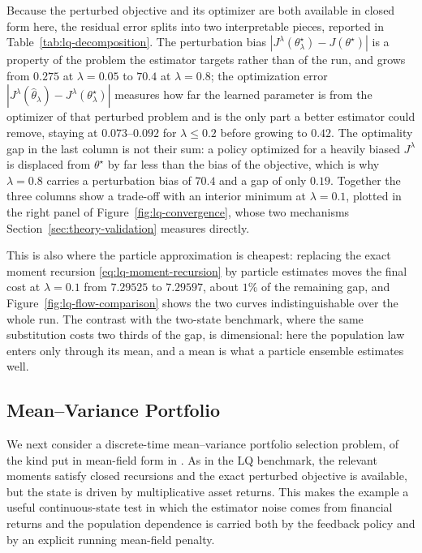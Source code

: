 Because the perturbed objective and its optimizer are both available in closed form here, the residual error splits into two interpretable pieces, reported in Table~\ref{tab:lq-decomposition}. The perturbation bias $|J^\lambda(\theta_\lambda^\star)-J(\theta^\star)|$ is a property of the problem the estimator targets rather than of the run, and grows from $0.275$ at $\lambda=0.05$ to $70.4$ at $\lambda=0.8$; the optimization error $|J^\lambda(\widehat\theta_\lambda)-J^\lambda(\theta_\lambda^\star)|$ measures how far the learned parameter is from the optimizer of that perturbed problem and is the only part a better estimator could remove, staying at $0.073$--$0.092$ for $\lambda\leq0.2$ before growing to $0.42$. The optimality gap in the last column is not their sum: a policy optimized for a heavily biased $J^\lambda$ is displaced from $\theta^\star$ by far less than the bias of the objective, which is why $\lambda=0.8$ carries a perturbation bias of $70.4$ and a gap of only $0.19$. Together the three columns show a trade-off with an interior minimum at $\lambda=0.1$, plotted in the right panel of Figure~\ref{fig:lq-convergence}, whose two mechanisms Section~\ref{sec:theory-validation} measures directly.



This is also where the particle approximation is cheapest: replacing the exact moment recursion \eqref{eq:lq-moment-recursion} by particle estimates moves the final cost at $\lambda=0.1$ from $7.29525$ to $7.29597$, about $1\%$ of the remaining gap, and Figure~\ref{fig:lq-flow-comparison} shows the two curves indistinguishable over the whole run. The contrast with the two-state benchmark, where the same substitution costs two thirds of the gap, is dimensional: here the population law enters only through its mean, and a mean is what a particle ensemble estimates well.


\subsection{Mean--Variance Portfolio}
\label{subsec:mean-variance-portfolio}

We next consider a discrete-time mean--variance portfolio selection problem, of the kind put in mean-field form in \cite{cui_li_li_mean_variance,fischer_livieri_mean_variance}. As in the LQ benchmark, the relevant moments satisfy closed recursions and the exact perturbed objective is available, but the state is driven by multiplicative asset returns. This makes the example a useful continuous-state test in which the estimator noise comes from financial returns and the population dependence is carried both by the feedback policy and by an explicit running mean-field penalty.

